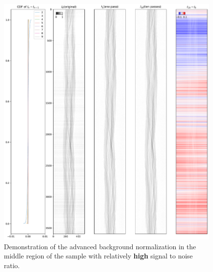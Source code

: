 \documentclass[12pt]{scrartcl}
\newcommand{\myscale}{1}
\begin{document}
\begin{figure}
\centering
\includegraphics[scale=\myscale]{sinogramNormalization_middle}
\caption{
Demonstration of the advanced background normalization in the middle region of the sample with relatively \textbf{high} signal to noise ratio.
}\label{fig: sino norm mid}
\end{figure}
\end{document}
